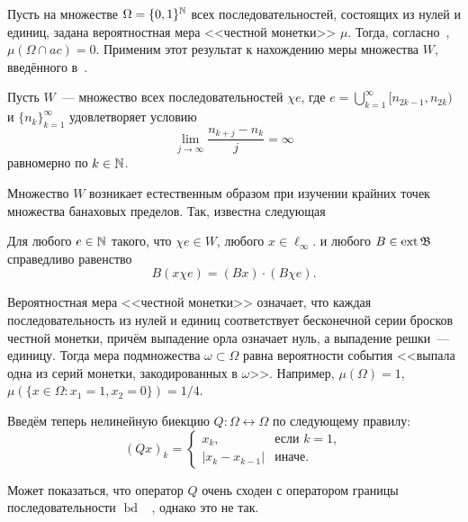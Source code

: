 Пусть на множестве $\Omega=\{0,1\}^{\mathbb{N}}$ всех последовательностей, состоящих из нулей и единиц,
задана вероятностная мера <<честной монетки>> $\mu$.
Тогда, согласно~\cite{connor1990almost}, $\mu(\Omega\cap ac)=0$.
Применим этот результат к нахождению меры множества $W$,
введённого в~\cite[\S 5]{Semenov2014geomprops}.

Пусть $W$~--- множество всех последовательностей $\chi e$, где $e =\bigcup_{k=1}^{\infty} [n_{2k-1}, n_{2k} )$
и $\{n_k \}_{k=1}^{\infty}$
удовлетворяет условию
\begin{equation}
	\label{eq:lim_j_n_kj_measure}
	\lim_{j\to\infty}\frac{n_{k+j} - n_k}{j} = \infty
\end{equation}
равномерно по $k \in \mathbb{N}$.

Множество $W$ возникает естественным образом при изучении крайних точек множества банаховых пределов.
Так, известна следующая
\begin{lemma}
	Для любого $e\in\mathbb{N}$ такого, что $\chi e \in W$,
	любого $x\in\ell_\infty$.
	и любого $B\in\operatorname{ext}\mathfrak{B}$
	справедливо равенство
	\begin{equation}
		B(x\chi e) = (Bx) \cdot (B\chi e)
		.
	\end{equation}
\end{lemma}


Вероятностная мера <<честной монетки>> означает,
что каждая последовательность из нулей и единиц соответствует бесконечной серии
бросков честной монетки, причём выпадение орла означает нуль, а выпадение решки~--- единицу.
Тогда мера подмножества $\omega\subset\Omega$
равна вероятности события <<выпала одна из серий монетки, закодированных в $\omega$>>.
Например, $\mu(\Omega)=1$, $\mu(\{x\in\Omega:x_1=1, x_2=0\})=1/4$.

Введём теперь нелинейную биекцию $Q:\Omega\leftrightarrow\Omega$ по следующему правилу:
\begin{equation}
	(Qx)_k = \begin{cases}
		x_k, &\mbox{если~} k = 1,
		\\
		|x_k-x_{k-1}|&\mbox{иначе}.
	\end{cases}
\end{equation}

\begin{remark}
	Может показаться, что оператор $Q$ очень сходен с оператором границы последовательности $\operatorname{bd}$
	~\cite{keller1992invariant},
	однако это не так.
\end{remark}

